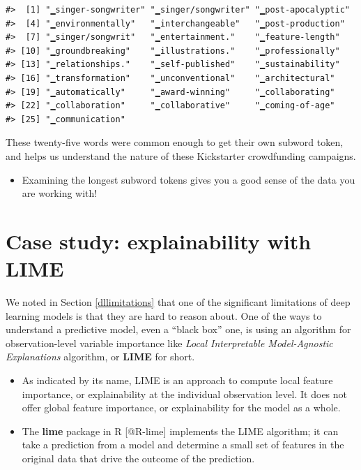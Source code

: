 \documentclass[
]{krantz}
\newenvironment{rmdblock}[1]
  {\begin{shaded*}
  \begin{itemize}[left = -1cm, labelsep = 1cm]
  \renewcommand{\labelitemi}{
    \raisebox{-.7\height}[0pt][0pt]{
      {\setkeys{Gin}{width=3em,keepaspectratio}\texttt{[image: images/\#1]}}
    }
  }
 
  \item
  }
  {
  \end{itemize}
  \end{shaded*}
  }
\newenvironment{rmdnote}
  {\begin{rmdblock}{note}}
  {\end{rmdblock}}
\newenvironment{rmdwarning}
  {\begin{rmdblock}{warning}}
  {\end{rmdblock}}
\newenvironment{rmdpackage}
  {\begin{rmdblock}{package}}
  {\end{rmdblock}}
\begin{document}
\begin{verbatim}
#>  [1] "▁singer-songwriter" "▁singer/songwriter" "▁post-apocalyptic" 
#>  [4] "▁environmentally"   "▁interchangeable"   "▁post-production"  
#>  [7] "▁singer/songwrit"   "▁entertainment."    "▁feature-length"   
#> [10] "▁groundbreaking"    "▁illustrations."    "▁professionally"   
#> [13] "▁relationships."    "▁self-published"    "▁sustainability"   
#> [16] "▁transformation"    "▁unconventional"    "▁architectural"    
#> [19] "▁automatically"     "▁award-winning"     "▁collaborating"    
#> [22] "▁collaboration"     "▁collaborative"     "▁coming-of-age"    
#> [25] "▁communication"
\end{verbatim}

These twenty-five words were common enough to get their own subword token, and helps us understand the nature of these Kickstarter crowdfunding campaigns.

\begin{rmdwarning}
Examining the longest subword tokens gives you a good sense of the data
you are working with!
\end{rmdwarning}

\hypertarget{lime}{%
\section{Case study: explainability with LIME}\label{lime}}

We noted in Section \ref{dllimitations} that one of the significant limitations of deep learning models is that they are hard to reason about. One of the ways to understand a predictive model, even a ``black box'' one, is using an algorithm for observation-level variable importance like \emph{Local Interpretable Model-Agnostic Explanations} \citep{ribeiro2016why} algorithm, or \textbf{LIME} for short.

\begin{rmdnote}
As indicated by its name, LIME is an approach to compute local feature
importance, or explainability at the individual observation level. It
does not offer global feature importance, or explainability for the
model as a whole.
\end{rmdnote}

\begin{rmdpackage}
The \textbf{lime} package in R {[}@R-lime{]} implements the LIME
algorithm; it can take a prediction from a model and determine a small
set of features in the original data that drive the outcome of the
prediction.
\end{rmdpackage}
\end{document}
